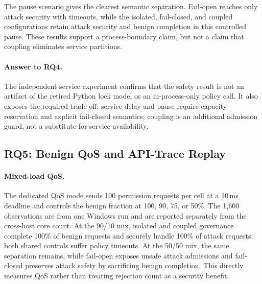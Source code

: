 The pause scenario gives the clearest semantic separation. Fail-open reaches
only \PermissionHttpservicepauseFiftymsLAYERSEPARATEDFAILOPENAttackSecure{} attack
security with \PermissionHttpservicepauseFiftymsLAYERSEPARATEDFAILOPENTimeout{}
timeouts, while the isolated, fail-closed, and coupled configurations retain
\PermissionHttpservicepauseFiftymsNEURONCOUPLEDAttackSecure{} attack security and
\PermissionHttpservicepauseFiftymsNEURONCOUPLEDBenignComplete{} benign completion
in this controlled pause. These results support a process-boundary claim, but
not a claim that coupling eliminates service partitions.

\paragraph{Answer to RQ4.}
The independent service experiment confirms that the safety result is not an
artifact of the retired Python lock model or an in-process-only policy call.
It also exposes the required trade-off: service delay and pause require
capacity reservation and explicit fail-closed semantics; coupling is an
additional admission guard, not a substitute for service availability.

\subsection{RQ5: Benign QoS and API-Trace Replay}
\label{sec:eval-e2e}

\paragraph{Mixed-load QoS.}
The dedicated QoS mode sends 100 permission requests per cell at a 10\,ms
deadline and controls the benign fraction at 100, 90, 75, or 50\%. The
1,600 observations are from one Windows run and are reported separately from
the cross-host core count. At the 90/10 mix, isolated and coupled governance
complete 100\% of benign requests and securely handle 100\% of attack
requests; both shared controls suffer policy timeouts. At the 50/50 mix, the
same separation remains, while fail-open exposes unsafe attack admissions and
fail-closed preserves attack safety by sacrificing benign completion. This
directly measures QoS rather than treating rejection count as a security
benefit.

